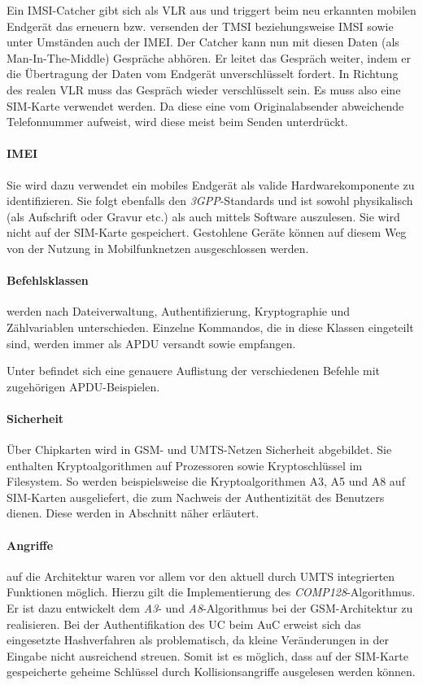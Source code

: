 Ein IMSI-Catcher gibt sich als \ac{VLR} aus und triggert beim neu
erkannten mobilen Endgerät das erneuern bzw. versenden der \ac{TMSI}
beziehungsweise \ac{IMSI} sowie unter Umständen auch der \ac{IMEI}. Der Catcher
kann nun mit diesen Daten (als Man-In-The-Middle) Gespräche abhören.
Er leitet das Gespräch weiter, indem er die Übertragung der Daten
vom Endgerät unverschlüsselt fordert. In Richtung des realen \ac{VLR}
muss das Gespräch wieder verschlüsselt sein. Es muss also eine SIM-Karte
verwendet werden. Da diese eine vom Originalabsender abweichende
Telefonnummer aufweist, wird diese meist beim Senden unterdrückt.

\paragraph{IMEI} Sie wird dazu verwendet ein mobiles Endgerät als
valide Hardwarekomponente zu identifizieren. Sie folgt ebenfalls
den \textit{3GPP}-Standards und ist sowohl physikalisch (als
Aufschrift oder Gravur etc.) als auch mittels Software auszulesen.
Sie wird nicht auf der SIM-Karte gespeichert. %
Gestohlene Geräte können auf diesem Weg von der Nutzung in
Mobilfunknetzen ausgeschlossen werden. 

\paragraph{Befehlsklassen} werden nach Dateiverwaltung, Authentifizierung, Kryptographie
und Zählvariablen unterschieden\cite{spitz11}. Einzelne Kommandos, die in diese
Klassen eingeteilt sind, werden immer als \ac{APDU} versandt sowie empfangen.

Unter  befindet sich eine genauere
Auflistung der verschiedenen Befehle mit zugehörigen \ac{APDU}-Beispielen.

\paragraph{Sicherheit}
Über Chipkarten wird in \ac{GSM}- und \ac{UMTS}-Netzen Sicherheit abgebildet.
Sie enthalten Kryptoalgorithmen auf Prozessoren sowie Kryptoschlüssel im
Filesystem. So werden beispielsweise die Kryptoalgorithmen A3, A5 und A8
auf SIM-Karten ausgeliefert, die zum Nachweis der Authentizität des Benutzers dienen.
Diese werden in Abschnitt 
näher erläutert.

\paragraph{Angriffe} auf die Architektur waren vor allem vor den aktuell durch UMTS
integrierten Funktionen möglich. Hierzu gilt die Implementierung des \textit{COMP128}-Algorithmus.
Er ist dazu entwickelt dem \textit{A3}- und \textit{A8}-Algorithmus bei der GSM-Architektur zu realisieren.
Bei der Authentifikation des UC beim \ac{AuC} erweist sich das eingesetzte Hashverfahren
als problematisch, da kleine Veränderungen in der Eingabe nicht ausreichend streuen. Somit
ist es möglich, dass auf der SIM-Karte gespeicherte geheime Schlüssel durch Kollisionsangriffe
ausgelesen werden können.

